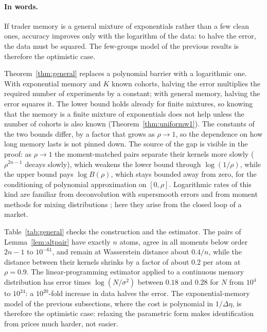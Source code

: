 \paragraph{In words.} If trader memory is a general mixture of exponentials rather than a few clean ones, accuracy improves only with the logarithm of the data: to halve the error, the data must be squared. The few-groups model of the previous results is therefore the optimistic case.


Theorem~\ref{thm:general} replaces a polynomial barrier with a logarithmic one. With exponential memory and $K$ known cohorts, halving the error multiplies the required number of experiments by a constant; with general memory, halving the error squares it. The lower bound holds already for finite mixtures, so knowing that the memory is a finite mixture of exponentials does not help unless the number of cohorts is also known (Theorem~\ref{thm:uniformw1}). The constants of the two bounds differ, by a factor that grows as $\rho\to1$, so the dependence on how long memory lasts is not pinned down. The source of the gap is visible in the proof: as $\rho\to1$ the moment-matched pairs separate their kernels more slowly ($\rho^{2n-1}$ decays slowly), which weakens the lower bound through $\log(1/\rho)$, while the upper bound pays $\log B(\rho)$, which stays bounded away from zero, for the conditioning of polynomial approximation on $[0,\rho]$. Logarithmic rates of this kind are familiar from deconvolution with supersmooth errors \citep{fan1991} and from moment methods for mixing distributions \citep{kong2017,wu2020}; here they arise from the closed loop of a market.

Table~\ref{tab:general} checks the construction and the estimator. The pairs of Lemma~\ref{lem:altpair} have exactly $n$ atoms, agree in all moments below order $2n-1$ to $10^{-61}$, and remain at Wasserstein distance about $0.4/n$, while the distance between their kernels shrinks by a factor of about $0.2$ per atom at $\rho=0.9$. The linear-programming estimator applied to a continuous memory distribution has error times $\log(N/\sigma^2)$ between $0.18$ and $0.28$ for $N$ from $10^4$ to $10^{24}$: a $10^{20}$-fold increase in data halves the error. The exponential-memory model of the previous subsections, where the cost is polynomial in $1/\Delta\eta$, is therefore the optimistic case: relaxing the parametric form makes identification from prices much harder, not easier.

